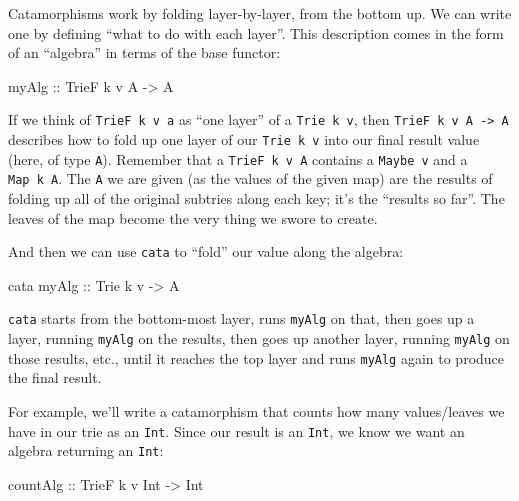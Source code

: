 \documentclass[]{article}
\newenvironment{Shaded}{}{}
\newcommand{\DataTypeTok}[1]{\textcolor[rgb]{0.56,0.13,0.00}{#1}}
\newcommand{\NormalTok}[1]{#1}
\newcommand{\OtherTok}[1]{\textcolor[rgb]{0.00,0.44,0.13}{#1}}
\begin{document}
Catamorphisms work by folding layer-by-layer, from the bottom up. We can write
one by defining ``what to do with each layer''. This description comes in the
form of an ``algebra'' in terms of the base functor:

\begin{Shaded}
\begin{Highlighting}[]
\OtherTok{myAlg ::} \DataTypeTok{TrieF}\NormalTok{ k v }\DataTypeTok{A} \OtherTok{->} \DataTypeTok{A}
\end{Highlighting}
\end{Shaded}

If we think of \texttt{TrieF\ k\ v\ a} as ``one layer'' of a
\texttt{Trie\ k\ v}, then \texttt{TrieF\ k\ v\ A\ -\textgreater{}\ A} describes
how to fold up one layer of our \texttt{Trie\ k\ v} into our final result value
(here, of type \texttt{A}). Remember that a \texttt{TrieF\ k\ v\ A} contains a
\texttt{Maybe\ v} and a \texttt{Map\ k\ A}. The \texttt{A} we are given (as the
values of the given map) are the results of folding up all of the original
subtries along each key; it's the ``results so far''. The leaves of the map
become the very thing we swore to create.

And then we can use \texttt{cata} to ``fold'' our value along the algebra:

\begin{Shaded}
\begin{Highlighting}[]
\NormalTok{cata}\OtherTok{ myAlg ::} \DataTypeTok{Trie}\NormalTok{ k v }\OtherTok{->} \DataTypeTok{A}
\end{Highlighting}
\end{Shaded}

\texttt{cata} starts from the bottom-most layer, runs \texttt{myAlg} on that,
then goes up a layer, running \texttt{myAlg} on the results, then goes up
another layer, running \texttt{myAlg} on those results, etc., until it reaches
the top layer and runs \texttt{myAlg} again to produce the final result.

For example, we'll write a catamorphism that counts how many values/leaves we
have in our trie as an \texttt{Int}. Since our result is an \texttt{Int}, we
know we want an algebra returning an \texttt{Int}:

\begin{Shaded}
\begin{Highlighting}[]
\OtherTok{countAlg ::} \DataTypeTok{TrieF}\NormalTok{ k v }\DataTypeTok{Int} \OtherTok{->} \DataTypeTok{Int}
\end{Highlighting}
\end{Shaded}
\end{document}
